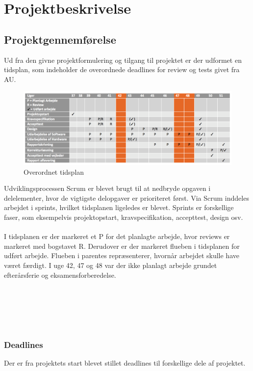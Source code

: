 \chapter{Projektbeskrivelse}

\section{Projektgennemførelse}
Ud fra den givne projektformulering og tilgang til projektet er der udformet en tidsplan, som indeholder de overordnede deadlines for review og tests givet fra AU.
\begin{figure}[H]
	\centering
	\includegraphics[width=1\textwidth]{Figurer/Snip20151210_74.png}
	\caption{Overordnet tidsplan}
\end{figure}
Udviklingsprocessen Scrum er blevet brugt til at nedbryde opgaven i delelementer, hvor de vigtigste delopgaver er prioriteret først. Via Scrum inddeles arbejdet i sprints, hvilket tidsplanen ligeledes er blevet. Sprints er forskellige faser, som eksempelvis projektopstart, kravspecifikation, accepttest, design osv.\\\\
I tidsplanen er der markeret et P for det planlagte arbejde, hvor reviews er markeret med bogstavet R. Derudover er der markeret flueben i tidsplanen for udført arbejde. Flueben i parentes repræsenterer, hvornår arbejdet skulle have været færdigt. I uge 42, 47 og 48 var der ikke planlagt arbejde grundet efterårsferie og eksamensforberedelse. 
\\\\
\\\\
\\\\
\subsection{Deadlines}
Der er fra projektets start blevet stillet deadlines til forskellige dele af projektet.

